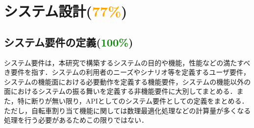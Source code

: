 \section{システム設計(\textcolor{orange}{77\%})}
  \label{sec:システム設計}
    \par
  
  \subsection{システム要件の定義(\textcolor{green}{100\%})}
    \label{sec:システム要件の定義}
      \par システム要件は，本研究で構築するシステムの目的や機能，性能などの満たすべき要件を指す．システムの利用者のニーズやシナリオ等を定義するユーザ要件，システムの機能面における必要動作を定義する機能要件，システムの機能以外の面におけるシステムの振る舞いを定義する非機能要件に大別してまとめる．また，特に断りが無い限り，APIとしてのシステム要件としての定義をまとめる．ただし，自転車割り当て機能に関しては数理最適化処理などの計算量が多くなる処理を行う必要があるためこの限りではない．

